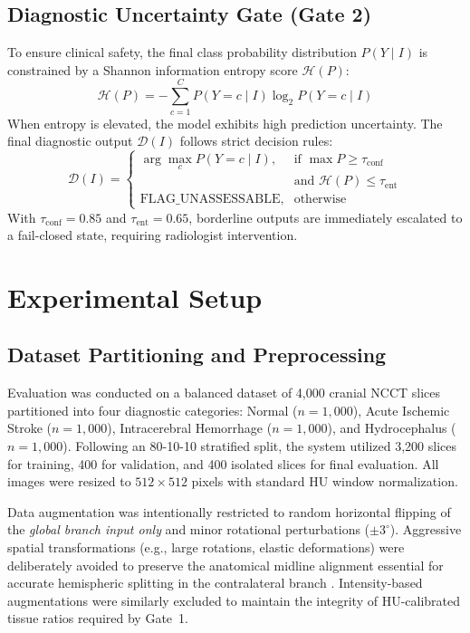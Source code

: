 \documentclass[conference]{IEEEtran}
\begin{document}
\subsection{Diagnostic Uncertainty Gate (Gate 2)}
To ensure clinical safety, the final class probability distribution $P(Y \mid I)$ is constrained by a Shannon information entropy score $\mathcal{H}(P)$:
\begin{equation}
\mathcal{H}(P) = -\sum_{c=1}^{C} P(Y=c \mid I) \log_2 P(Y=c \mid I)
\end{equation}
When entropy is elevated, the model exhibits high prediction uncertainty. The final diagnostic output $\mathcal{D}(I)$ follows strict decision rules:
\begin{equation}
\mathcal{D}(I) = \begin{cases} 
\arg\max_c P(Y=c \mid I), & \text{if } \max P \ge \tau_{\text{conf}} \\
& \text{and } \mathcal{H}(P) \le \tau_{\text{ent}} \\
\text{FLAG\_UNASSESSABLE}, & \text{otherwise}
\end{cases}
\end{equation}
With $\tau_{\text{conf}} = 0.85$ and $\tau_{\text{ent}} = 0.65$, borderline outputs are immediately escalated to a fail-closed state, requiring radiologist intervention.

\section{Experimental Setup}

\subsection{Dataset Partitioning and Preprocessing}
Evaluation was conducted on a balanced dataset of 4,000 cranial NCCT slices partitioned into four diagnostic categories: Normal ($n=1{,}000$), Acute Ischemic Stroke ($n=1{,}000$), Intracerebral Hemorrhage ($n=1{,}000$), and Hydrocephalus ($n=1{,}000$). Following an 80-10-10 stratified split, the system utilized 3,200 slices for training, 400 for validation, and 400 isolated slices for final evaluation. All images were resized to $512 \times 512$ pixels with standard HU window normalization.

Data augmentation was intentionally restricted to random horizontal flipping of the \emph{global branch input only} and minor rotational perturbations ($\pm 3^{\circ}$). Aggressive spatial transformations (e.g., large rotations, elastic deformations) were deliberately avoided to preserve the anatomical midline alignment essential for accurate hemispheric splitting in the contralateral branch \cite{b17}. Intensity-based augmentations were similarly excluded to maintain the integrity of HU-calibrated tissue ratios required by Gate~1.
\end{document}
